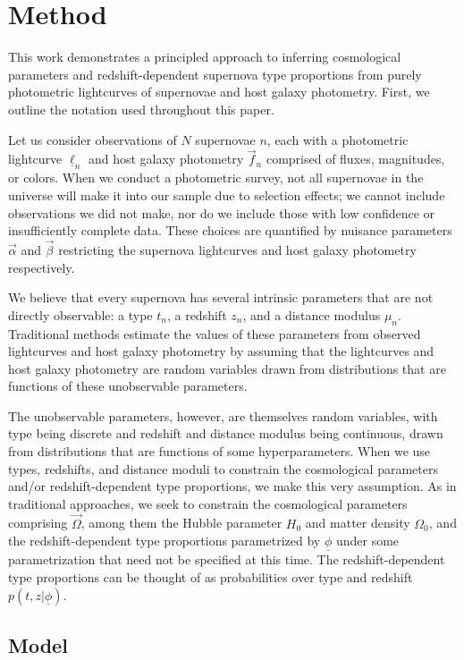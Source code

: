 \documentclass[12pt, onecolumn]{emulateapj}
\newcommand{\textul}{\underline}
\begin{document}
\section{Method}
\label{sec:method}

This work demonstrates a principled approach to inferring cosmological parameters and redshift-dependent supernova type proportions from purely photometric lightcurves of supernovae and host galaxy photometry.  First, we outline the notation used throughout this paper.

Let us consider observations of $N$ supernovae $n$, each with a photometric lightcurve $\textul{\ell}_{n}$ and host galaxy photometry $\vec{f}_{n}$ comprised of fluxes, magnitudes, or colors.  When we conduct a photometric survey, not all supernovae in the universe will make it into our sample due to selection effects; we cannot include observations we did not make, nor do we include those with low confidence or insufficiently complete data.  These choices are quantified by nuisance parameters $\vec{\alpha}$ and $\vec{\beta}$ restricting the supernova lightcurves and host galaxy photometry respectively.  

We believe that every supernova has several intrinsic parameters that are not directly observable: a type $t_{n}$, a redshift $z_{n}$, and a distance modulus $\mu_{n}$.   Traditional methods estimate the values of these parameters from observed lightcurves and host galaxy photometry by assuming that the lightcurves and host galaxy photometry are random variables drawn from distributions that are functions of these unobservable parameters.
 
The unobservable parameters, however, are themselves random variables, with type being discrete and redshift and distance modulus being continuous, drawn from distributions that are functions of some hyperparameters.  When we use types, redshifts, and distance moduli to constrain the cosmological parameters and/or redshift-dependent type proportions, we make this very assumption.  As in traditional approaches, we seek to constrain the cosmological parameters comprising $\vec{\Omega}$, among them the Hubble parameter $H_{0}$ and matter density $\Omega_{0}$, and the redshift-dependent type proportions parametrized by $\textul{\phi}$ under some parametrization that need not be specified at this time.  The redshift-dependent type proportions can be thought of as probabilities over type and redshift $p(t, z | \textul{\phi})$.

\subsection{Model}
\label{sec:model}
\end{document}
